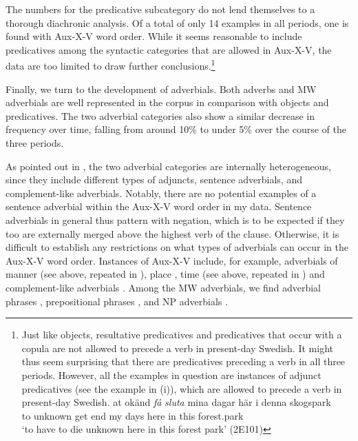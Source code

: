\documentclass[output=paper, colorlinks, citecolor=brown]{langscibook}
\begin{document}
The numbers for the predicative subcategory do not lend themselves to a thorough diachronic analysis. Of a total of only 14 examples in all periods, one is found with Aux-X-V word order. While it seems reasonable to include predicatives among the syntactic categories that are allowed in Aux-X-V, the data are too limited to draw further conclusions.\footnote{Just like objects, resultative predicatives and predicatives that occur with a copula are not allowed to precede a verb in present-day Swedish. It might thus seem surprising that there are predicatives preceding a verb in all three periods. However, all the examples in question are instances of adjunct predicatives (see the example in (i)), which are allowed to precede a verb in present-day Swedish.  
\ea \gll at okänd \textit{få} \textit{sluta} mina  dagar  här  i  denna  skogspark\\
         to unknown  get  end  my  days  here  in  this  forest.park\\
     \glt ‘to have to die unknown here in this forest park’ (2E101)
\z}



Finally, we turn to the development of adverbials. Both adverbs and MW adverbials are well represented in the corpus in comparison with objects and predicatives. The two adverbial categories also show a similar decrease in frequency over time, falling from around 10\% to under 5\% over the course of the three periods.



As pointed out in , the two adverbial categories are internally heterogeneous, since they include different types of adjuncts, sentence adverbials, and complement-like adverbials. Notably, there are no potential examples of a sentence adverbial within the Aux-X-V word order in my data. Sentence adverbials in general thus pattern with negation, which is to be expected if they too are externally merged above the highest verb of the clause. Otherwise, it is difficult to establish any restrictions on what types of adverbials can occur in the Aux-X-V word order. Instances of Aux-X-V include, for example, adverbials of manner (see  above, repeated in ), place , time (see  above, repeated in ) and complement-like adverbials . Among the MW adverbials, we find adverbial phrases , prepositional phrases , and NP adverbials .
\end{document}
